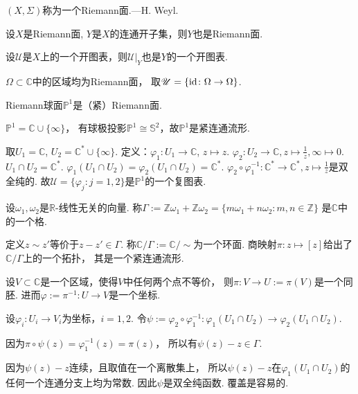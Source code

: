 \begin{definition}
	$(X,\Sigma)$称为一个Riemann面.---H. Weyl.
\end{definition}
		
\begin{example}
	设$X$是Riemann面, $Y$是$X$的连通开子集，则$Y$也是Riemann面.

	设$\mathscr{U}$是$X$上的一个开图表，则$\mathscr{U}|_Y$也是$Y$的一个开图表.
\end{example}
		
\begin{example}
	$\Omega\subset \mathbb{C}$中的区域均为Riemann面，
    取$\mathscr{U}=\{\operatorname{id}\colon \Omega\rightarrow \Omega\}$.
\end{example}

\begin{example}
	Riemann球面$\mathbb{P}^1$是（紧）Riemann面.

	$\mathbb{P}^1=\mathbb{C}\cup \{\infty\}$，
    有球极投影$\mathbb{P}^1\cong \mathbb{S}^2$，故$\mathbb{P}^1$是紧连通流形.
		
	取$U_1=\mathbb{C}$, $U_2=\mathbb{C}^*\cup \{\infty\}$. 
    定义：$\varphi_1\colon U_1\rightarrow \mathbb{C}$, $z\mapsto z$. 
    $\varphi_2\colon U_2\rightarrow \mathbb{C}, z\mapsto \frac{1}{z}, \infty \mapsto 0$. 
    $U_1\cap U_2=\mathbb{C}^*$. $\varphi_1(U_1\cap U_2)=\varphi_2(U_1\cap U_2)=\mathbb{C}^*$. 
    $\varphi_2\circ \varphi_1^{-1}\colon \mathbb{C}^*\rightarrow \mathbb{C}^*, z\mapsto \frac{1}{z}$是双全纯的. 
    故$\mathscr{U}=\{\varphi_j:j=1,2\}$是$\mathbb{P}^1$的一个复图表.
\end{example}

\begin{example}[环面是Riemann面]
	设$\omega_1, \omega_2$是$\mathbb{R}$-线性无关的向量. 
    称$\Gamma:=\mathbb{Z}\omega_1+\mathbb{Z}\omega_2=\{m\omega_1+n\omega_2:m,n\in \mathbb{Z}\}$
    是$\mathbb{C}$中的一个格.

	定义$z\sim z'$等价于$z-z'\in \Gamma$. 
    称$\mathbb{C}/\Gamma:=\mathbb{C}/\sim$为一个环面. 
    商映射$\pi\colon z\mapsto [z]$给出了$\mathbb{C}/\Gamma$上的一个拓扑，
    其是一个紧连通流形.

	设$V\subset \mathbb{C}$是一个区域，使得$V$中任何两个点不等价，
    则$\pi\colon V\rightarrow U:=\pi(V)$是一个同胚. 
    进而$\varphi:=\pi^{-1}\colon U\rightarrow V$是一个坐标.

	设$\varphi_i\colon U_i\rightarrow V_i$为坐标，$i=1,2$. 
    令$\psi:=\varphi_2\circ \varphi_1^{-1}\colon \varphi_1(U_1\cap U_2)
    \rightarrow \varphi_2(U_1\cap U_2)$.

	因为$\pi\circ \psi(z)=\varphi_1^{-1}(z)=\pi(z)$，
    所以有$\psi(z)-z\in \Gamma$.

	因为$\psi(z)-z$连续，且取值在一个离散集上，
    所以$\psi(z)-z$在$\varphi_1(U_1\cap U_2)$的任何一个连通分支上均为常数. 
    因此$\psi$是双全纯函数. 覆盖是容易的.
\end{example}	
		
